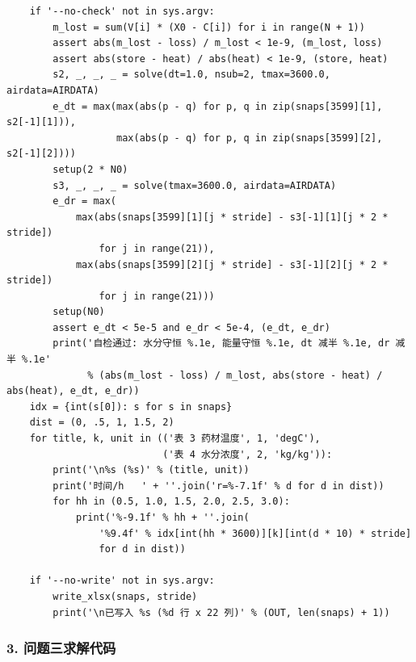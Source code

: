 \documentclass[12pt,a4paper]{article}
\begin{document}
\begin{lstlisting}
    if '--no-check' not in sys.argv:
        m_lost = sum(V[i] * (X0 - C[i]) for i in range(N + 1))
        assert abs(m_lost - loss) / m_lost < 1e-9, (m_lost, loss)
        assert abs(store - heat) / abs(heat) < 1e-9, (store, heat)
        s2, _, _, _ = solve(dt=1.0, nsub=2, tmax=3600.0, airdata=AIRDATA)
        e_dt = max(max(abs(p - q) for p, q in zip(snaps[3599][1], s2[-1][1])),
                   max(abs(p - q) for p, q in zip(snaps[3599][2], s2[-1][2])))
        setup(2 * N0)
        s3, _, _, _ = solve(tmax=3600.0, airdata=AIRDATA)
        e_dr = max(
            max(abs(snaps[3599][1][j * stride] - s3[-1][1][j * 2 * stride])
                for j in range(21)),
            max(abs(snaps[3599][2][j * stride] - s3[-1][2][j * 2 * stride])
                for j in range(21)))
        setup(N0)
        assert e_dt < 5e-5 and e_dr < 5e-4, (e_dt, e_dr)
        print('自检通过: 水分守恒 %.1e, 能量守恒 %.1e, dt 减半 %.1e, dr 减半 %.1e'
              % (abs(m_lost - loss) / m_lost, abs(store - heat) / abs(heat), e_dt, e_dr))
    idx = {int(s[0]): s for s in snaps}
    dist = (0, .5, 1, 1.5, 2)
    for title, k, unit in (('表 3 药材温度', 1, 'degC'),
                           ('表 4 水分浓度', 2, 'kg/kg')):
        print('\n%s (%s)' % (title, unit))
        print('时间/h   ' + ''.join('r=%-7.1f' % d for d in dist))
        for hh in (0.5, 1.0, 1.5, 2.0, 2.5, 3.0):
            print('%-9.1f' % hh + ''.join(
                '%9.4f' % idx[int(hh * 3600)][k][int(d * 10) * stride]
                for d in dist))

    if '--no-write' not in sys.argv:
        write_xlsx(snaps, stride)
        print('\n已写入 %s (%d 行 x 22 列)' % (OUT, len(snaps) + 1))
\end{lstlisting}

\subsubsection*{3. 问题三求解代码}
\end{document}
